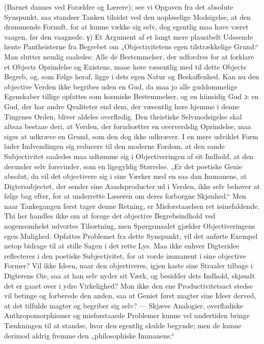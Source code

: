 \documentclass[12pt]{book}
\newcommand{\dsi}{\textup{ɔ:}}
\newcommand{\opage}[1]{\marginnote{\footnotesize\textit{[#1]}}}
\begin{document}
(Barnet dannes ved Forældre og Lærere); see vi Opgaven fra det
absolute Synspunkt, saa standser Tanken tilsidst ved den uopløselige
Modsigelse, at den drømmende Fornuft, for at kunne vække sig selv,
dog egentlig maa have været vaagen, før den vaagnede. γ) Et
Argument af et langt mere plausibelt Udseende hente Pantheisterne
fra Begrebet om „Objectivitetens egen tilstrækkelige Grund.“ Man
slutter nemlig saaledes: Alle de Bestemmelser, der udfordres for at
forklare et Objects Oprindelse og Existens, maae høre væsentlig med
til dette Objects Begreb, og, som Følge heraf, ligge i dets egen
Natur og Beskaffenhed. Kan nu den objective Verden ikke begribes
uden en Gud, da maa jo alle guddommelige Egenskaber tillige
opfattes som kosmiske Bestemmelser, og en hiinsidig Gud \dsi{} en
Gud, der har andre Qvaliteter end dem, der væsentlig høre hjemme i
denne Tingenes Orden, bliver aldeles overflødig. Den theistiske
Selvmodsigelse skal altsaa bestaae deri, at Verden, der forudsætter
en oververdslig Oprindelse, maa siges at udkræve en Grund, som den
dog ikke udkræver. I en mere udviklet Form lader Indvendingen sig
reducere til den moderne Fordom, at den sande Subjectivitet
saaledes maa udtømme sig i Objectiveringen af sit Indhold, at den
derunder selv forsvinder, som en ligegyldig Størrelse. „Er det
poetiske Genie absolut, da vil det objectivere sig i sine Værker
med en saa%
\opage{235}dan Immanens, at Digtersubjectet, der sender sine Aandsproducter ud
i Verden, ikke selv behøver at følge bag efter, for at underrette
Læseren om deres forborgne Skjønhed.“ Men naar Tankegangen først
tager denne Retning, er Misforstaaelsen ret iøinefaldende. Thi her
handles ikke om at forøge det objective Begrebsindhold ved
nogensomhelst udvortes Tilsætning, men Spørgsmaalet gjælder
Objectiveringens egen Mulighed. Opfattes Problemet fra dette
Synspunkt, vil det anførte Exempel netop bidrage til at stille
Sagen i det rette Lys. Maa ikke enhver Digteridee reflecteres i den
poetiske Subjectivitet, for at vorde immanent i sine objective
Former? Vil ikke Ideen, naar den objectiveres, igjen kaste sine
Straaler tilbage i Digterens Øie, saa at han selv nyder sit Værk,
og besidder dets Indhold, skjøndt det er gaaet over i ydre
Virkelighed? Mon ikke den ene Productivitetsact stedse vil betinge
og forberede den anden, saa at Geniet først magter sine Ideer
derved, at det tilfulde magter og begriber sig selv? --- Skjæve
Analogier, overfladiske Anthropomorphismer og misforstaaede
Problemer kunne vel undertiden bringe Tænkningen til at standse,
hvor den egentlig skulde begynde; men de kunne derimod aldrig
fremme den „philosophiske Immanens.“
\end{document}
